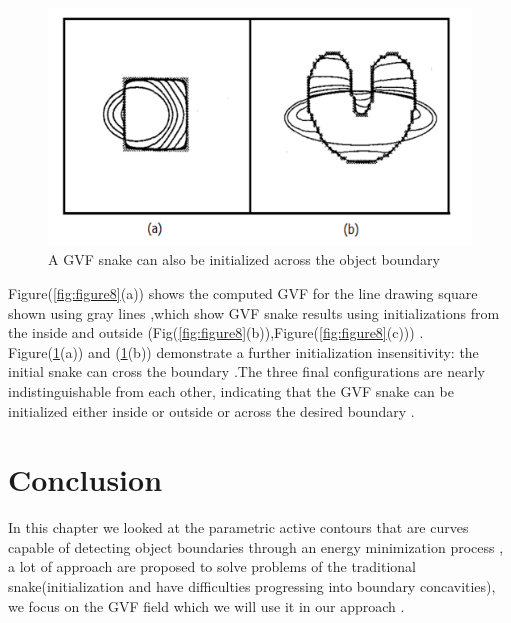 \begin{figure}[ht!]
        \centering
        \includegraphics[width=15cm]{chapiter2/figures/FIG9.png}
        \caption{A GVF snake can also be initialized across the object boundary\cite{2.8}}
        \label{fig:figure9}
\end{figure}

\hspace{-0.6cm}Figure(\ref{fig:figure8}(a)) shows the computed GVF for the line drawing square shown using gray lines
,which show GVF snake results using initializations from the inside and outside (Fig(\ref{fig:figure8}(b)),Figure(\ref{fig:figure8}(c))) .\\
Figure(\ref{fig:figure9}(a)) and (\ref{fig:figure9}(b)) demonstrate a further initialization insensitivity: the initial snake can cross the boundary
.The three final configurations are nearly indistinguishable from each other, indicating that the GVF snake can be
initialized either inside or outside or across the desired boundary \cite{2.8}.

\section{Conclusion}\label{sec:conclusion-ch2}
In this chapter we looked at the parametric active contours that
are curves capable of detecting object boundaries through an energy
minimization process , a lot of approach are proposed to solve problems of the
traditional snake(initialization and have difficulties progressing into boundary
concavities), we focus on the GVF field which we will use it in our approach .